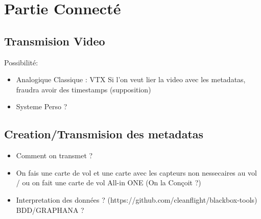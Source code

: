 \documentclass{article}
\begin{document}
\section{Partie Connecté}
\subsection{Transmision Video}
Possibilité: \\
\begin{itemize}
    \item Analogique Classique  :  VTX 
    \subitem Si l'on veut lier la video avec les metadatas, fraudra avoir des timestamps (supposition)
    \item Systeme Perso ? 
    
\end{itemize}
\subsection{Creation/Transmision des metadatas}
\begin{itemize}
    \item Comment on transmet ?
    \item On fais une carte de vol et une carte avec les capteurs non nessecaires au vol / ou on fait une carte de vol All-in ONE (On la Conçoit ?)
    \item Interpretation des données ? (https://github.com/cleanflight/blackbox-tools) BDD/GRAPHANA ?
\end{itemize}
\end{document}
